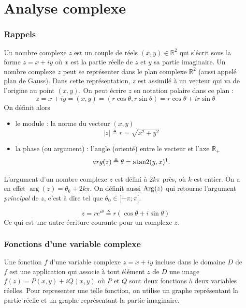 
\part{Analyse complexe}
\section{Rappels}
\begin{mydef}
	Un nombre complexe $z$ est un couple de réels $(x,y) \in \mathbb{R}^2$ qui s'écrit
	sous la forme $z=x+iy$ où $x$ est la partie réelle de $z$ et $y$
	sa partie imaginaire. Un nombre complexe $z$ peut se représenter
	dans le plan complexe $\mathbb{R}^2$ (aussi appelé plan de Gauss).
	Dans cette représentation, $z$ est assimilé à un vecteur qui va de
	l'origine au point $(x,y)$. On peut écrire $z$ en notation polaire
	dans ce plan : 
	\[z = x+iy = (x,y) = (r\cos\theta, r\sin\theta) = r\cos\theta + i r\sin\theta\]
	On définit alors
	\begin{itemize}
	    \item le module : la norme du vecteur $(x,y)$
	    \[|z| \triangleq r = \sqrt{x^2+y^2}\]
	    \item la phase (ou argument) : l'angle (orienté) entre le vecteur
	    et l'axe $\mathbb{R}_+$
	    \[arg(z) \triangleq \theta = \Atan(y, x)\footnotemark.\]
	\end{itemize}

\end{mydef}

\begin{mydef}
	L'argument d'un nombre complexe $z$ est défini à $2k\pi$ près, où
	$k$ est entier. On a en effet $\arg(z) = \theta_0 + 2k\pi$. On définit aussi
	$\operatorname{Arg}(z)$ qui retourne l'argument \textit{principal} de $z$,
	c'est à dire tel que $\theta_0 \in [-\pi;\pi[$.
\end{mydef}

\begin{mydef}
	\[z = re^{i\theta} \triangleq r(\cos\theta+i\sin\theta)\]
	Ce qui est une autre écriture courante pour un complexe $z$.
\end{mydef}

\section{Fonctions d'une variable complexe}
\begin{mydef}
	Une fonction $f$ d'une variable complexe $z=x+iy$ incluse dans
	le domaine $D$ de $f$ est une application qui associe à tout
	élément $z$ de $D$ une image $f(z) = P(x,y) + iQ(x,y)$ où
	$P$ et $Q$ sont deux fonctions à deux variables réelles.
	Pour representer une telle fonction, on utilise un
	graphe représentant la partie réelle et un graphe
	représentant la partie imaginaire.
\end{mydef}


